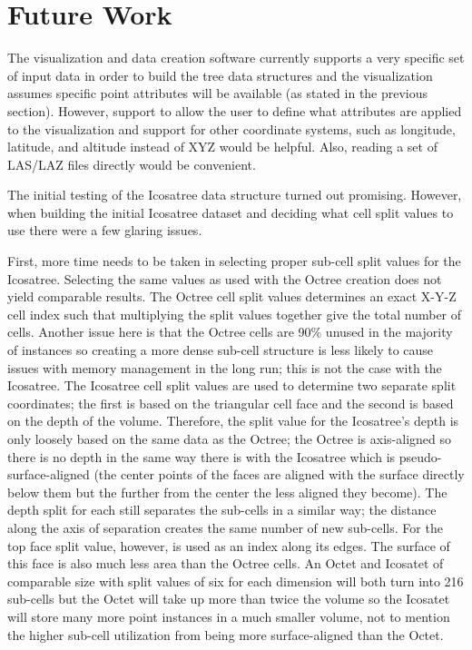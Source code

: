 \section{Future Work}

The visualization and data creation software currently supports a very specific
set of input data in order to build the tree data structures and the
visualization assumes specific point attributes will be available (as stated in
the previous section). However, support to allow the user to define what
attributes are applied to the visualization and support for other coordinate
systems, such as longitude, latitude, and altitude instead of XYZ would be
helpful. Also, reading a set of LAS/LAZ files directly would be convenient.

The initial testing of the Icosatree data structure turned out promising.
However, when building the initial Icosatree dataset and deciding what cell
split values to use there were a few glaring issues.

First, more time needs to be taken in selecting proper sub-cell split values for
the Icosatree. Selecting the same values as used with the Octree creation does
not yield comparable results. The Octree cell split values determines an exact
X-Y-Z cell index such that multiplying the split values together give the total
number of cells. Another issue here is that the Octree cells are 90\% unused in
the majority of instances so creating a more dense sub-cell structure is less
likely to cause issues with memory management in the long run; this is not the
case with the Icosatree. The Icosatree cell split values are used to determine
two separate split coordinates; the first is based on the triangular cell face
and the second is based on the depth of the volume. Therefore, the split value
for the Icosatree's depth is only loosely based on the same data as the
Octree; the Octree is axis-aligned so there is no depth in the same way there
is with the Icosatree which is pseudo-surface-aligned (the center points of the
faces are aligned with the surface directly below them but the further from the
center the less aligned they become). The depth split for each still separates
the sub-cells in a similar way; the distance along the axis of separation
creates the same number of new sub-cells. For the top face split value, however,
is used as an index along its edges. The surface of this face is also much less
area than the Octree cells. An Octet and Icosatet of comparable size with split
values of six for each dimension will both turn into 216 sub-cells but the Octet
will take up more than twice the volume so the Icosatet will store many more
point instances in a much smaller volume, not to mention the higher sub-cell
utilization from being more surface-aligned than the Octet.

